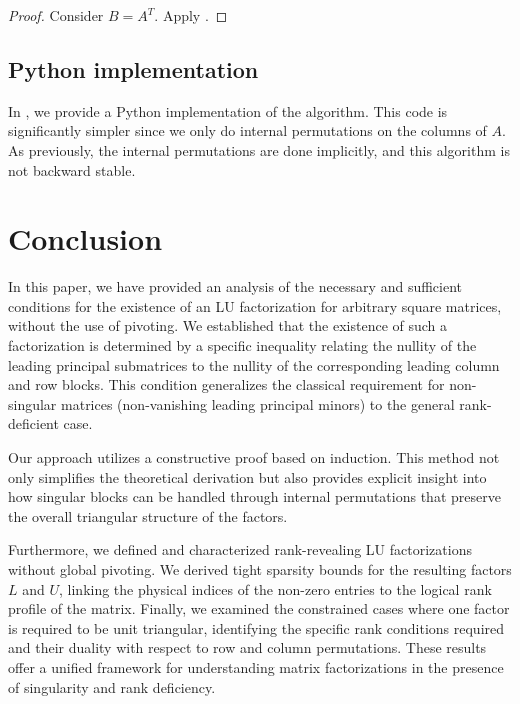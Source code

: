\documentclass[10pt,twoside]{siamart1116}
\numberwithin{theorem}{section}
\begin{document}
\begin{proof}
	Consider $B = A^T$. Apply .
\end{proof}

\subsection{Python implementation}

In , we provide a Python implementation of the algorithm. This code is significantly simpler since we only do internal permutations on the columns of $A$. As previously, the internal permutations are done implicitly, and this algorithm is not backward stable.

\section{Conclusion}

In this paper, we have provided an analysis of the necessary and sufficient conditions for the existence of an LU factorization for arbitrary square matrices, without the use of pivoting. We established that the existence of such a factorization is determined by a specific inequality relating the nullity of the leading principal submatrices to the nullity of the corresponding leading column and row blocks. This condition generalizes the classical requirement for non-singular matrices (non-vanishing leading principal minors) to the general rank-deficient case.

Our approach utilizes a constructive proof based on induction. This method not only simplifies the theoretical derivation but also provides explicit insight into how singular blocks can be handled through internal permutations that preserve the overall triangular structure of the factors.

Furthermore, we defined and characterized rank-revealing LU factorizations without global pivoting. We derived tight sparsity bounds for the resulting factors $L$ and $U$, linking the physical indices of the non-zero entries to the logical rank profile of the matrix. Finally, we examined the constrained cases where one factor is required to be unit triangular, identifying the specific rank conditions required and their duality with respect to row and column permutations. These results offer a unified framework for understanding matrix factorizations in the presence of singularity and rank deficiency.

\appendix
\end{document}
